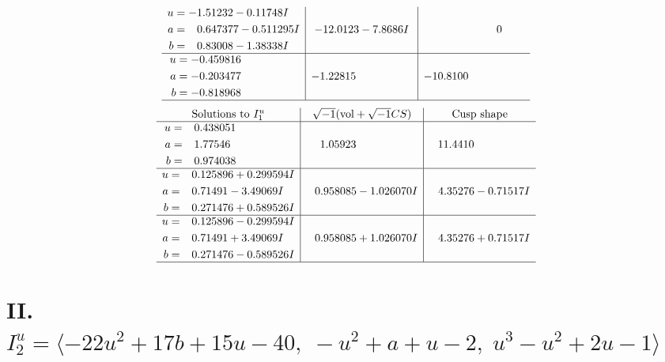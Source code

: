 \documentclass[1p]{elsarticle_modified}
\theoremstyle{definition}
\newcommand{\I}{\sqrt{-1}}
\begin{document}
$$\begin{array}{c|c|c}
\begin{aligned}
u &= -1.51232 - 0.11748 I \\
a &= \phantom{-}0.647377 - 0.511295 I \\
b &= \phantom{-}0.83008 - 1.38338 I\end{aligned}
 & -12.0123 - 7.8686 I & \phantom{-0.000000 } 0 \\ \hline\begin{aligned}
u &= -0.459816\phantom{ +0.000000I} \\
a &= -0.203477\phantom{ +0.000000I} \\
b &= -0.818968\phantom{ +0.000000I}\end{aligned}
 & -1.22815\phantom{ +0.000000I} & -10.8100\phantom{ +0.000000I}\\
 \hline 
 \end{array}$$\newpage$$\begin{array}{c|c|c}  
\text{Solutions to }I^u_{1}& \I (\text{vol} + \sqrt{-1}CS) & \text{Cusp shape}\\
 \hline 
\begin{aligned}
u &= \phantom{-}0.438051\phantom{ +0.000000I} \\
a &= \phantom{-}1.77546\phantom{ +0.000000I} \\
b &= \phantom{-}0.974038\phantom{ +0.000000I}\end{aligned}
 & \phantom{-}1.05923\phantom{ +0.000000I} & \phantom{-}11.4410\phantom{ +0.000000I} \\ \hline\begin{aligned}
u &= \phantom{-}0.125896 + 0.299594 I \\
a &= \phantom{-}0.71491 - 3.49069 I \\
b &= \phantom{-}0.271476 + 0.589526 I\end{aligned}
 & \phantom{-}0.958085 - 1.026070 I & \phantom{-}4.35276 - 0.71517 I \\ \hline\begin{aligned}
u &= \phantom{-}0.125896 - 0.299594 I \\
a &= \phantom{-}0.71491 + 3.49069 I \\
b &= \phantom{-}0.271476 - 0.589526 I\end{aligned}
 & \phantom{-}0.958085 + 1.026070 I & \phantom{-}4.35276 + 0.71517 I\\
 \hline 
 \end{array}$$\newpage\newpage\renewcommand{\arraystretch}{1}
\centering \section*{II. $I^u_{2}= \langle -22 u^2+17 b+15 u-40,\;- u^2+a+u-2,\;u^3- u^2+2 u-1 \rangle$}
\end{document}
